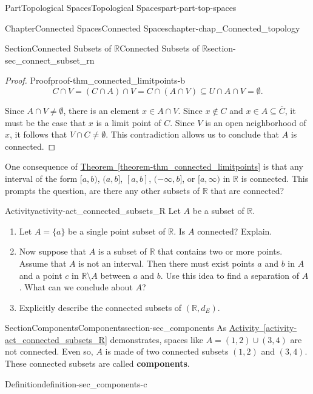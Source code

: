 \documentclass[oneside,10pt,]{book}
\newcommand{\xreffont}{\relax}
\newcommand{\terminology}[1]{\textbf{#1}}
\numberwithin{equation}{chapter}
\newcommand{\R}{\mathbb{R}}
\begin{document}
\begin{partptx}{Part}{Topological Spaces}{}{Topological Spaces}{}{}{part-part-top-spaces}
\begin{chapterptx}{Chapter}{Connected Spaces}{}{Connected Spaces}{}{}{chapter-chap_Connected_topology}
\begin{sectionptx}{Section}{Connected Subsets of \(\R\)}{}{Connected Subsets of \(\R\)}{}{}{section-sec_connect_subset_rn}
\begin{proof}{Proof}{}{proof-thm_connected_limitpoints-b}
\begin{equation*}
C \cap V = (C \cap A) \cap V = C \cap (A \cap V)  \subseteq U \cap A \cap V = \emptyset\text{.}
\end{equation*}
%
\par
Since \(A \cap V \neq \emptyset\), there is an element \(x \in A \cap V\). Since \(x \notin C\) and \(x \in A \subseteq \overline{C}\), it must be the case that \(x\) is a limit point of \(C\). Since \(V\) is an open neighborhood of \(x\), it follows that \(V \cap C \neq \emptyset\). This contradiction allows us to conclude that \(A\) is connected.%
\end{proof}
One consequence of \hyperref[theorem-thm_connected_limitpoints]{Theorem~{\xreffont\ref{theorem-thm_connected_limitpoints}}} is that any interval of the form \([a,b)\), \((a,b]\), \([a,b]\), \((-\infty,
b]\), or \([a, \infty)\) in \(\R\) is connected. This prompts the question, are there any other subsets of \(\R\) that are connected?%
\begin{activity}{Activity}{}{activity-act_connected_subsets_R}%
Let \(A\) be a subset of \(\R\).%
\begin{enumerate}[font=\bfseries,label=(\alph*),ref=\alph*]%
\item{}Let \(A = \{a\}\) be a single point subset of \(\R\). Is \(A\) connected? Explain.%
\item{}Now suppose that \(A\) is a subset of \(\R\) that contains two or more points. Assume that \(A\) is not an interval. Then there must exist points \(a\) and \(b\) in \(A\) and a point \(c\) in \(\R \setminus A\) between \(a\) and \(b\). Use this idea to find a separation of \(A\). What can we conclude about \(A\)?%
\item{}Explicitly describe the connected subsets of \((\R, d_E)\).%
\end{enumerate}%
\end{activity}%
\end{sectionptx}
%
%
\typeout{************************************************}
\typeout{************************************************}
%
\begin{sectionptx}{Section}{Components}{}{Components}{}{}{section-sec_components}
As \hyperref[activity-act_connected_subsets_R]{Activity~{\xreffont\ref{activity-act_connected_subsets_R}}} demonstrates, spaces like \(A = (1,2) \cup (3,4)\) are not connected. Even so, \(A\) is made of two connected subsets \((1,2)\) and \((3,4)\). These connected subsets are called \terminology{components}.%
\begin{definition}{Definition}{}{definition-sec_components-c}%

\end{definition}
\end{sectionptx}
\end{chapterptx}
\end{partptx}
\end{document}
